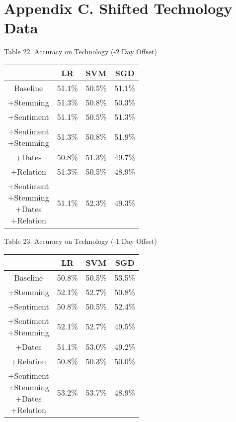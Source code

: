 \documentclass[11pt,a4paper]{article}
\begin{document}
\section{Appendix C. Shifted Technology Data}
\begin{center}
Table 22. Accuracy on Technology (-2 Day Offset)\\
\begin{tabular}{ |c|c|c|c| }
 \hline
  & LR & SVM & SGD \\
  \hline
  Baseline & 51.1\% & 50.5\% & 51.1\% \\
  \hline
 +Stemming & 51.3\% & 50.8\% & 50.3\% \\
  \hline
 +Sentiment & 51.1\% & 50.5\% & 51.3\% \\
  \hline
  \shortstack{+Sentiment \\ +Stemming} & 51.3\% & 50.8\% & 51.9\%\\
 \hline
 +Dates & 50.8\% & 51.3\% & 49.7\% \\
  \hline
 +Relation & 51.3\% & 50.5\% & 48.9\% \\
  \hline
  \shortstack{+Sentiment \\ +Stemming \\+Dates \\+Relation} & 51.1\% & 52.3\% & 49.3\% \\
 \hline
\end{tabular}
\end{center}

\begin{center}
Table 23. Accuracy on Technology (-1 Day Offset)\\
\begin{tabular}{ |c|c|c|c| }
 \hline
  & LR & SVM & SGD \\
  \hline
  Baseline & 50.8\% & 50.5\% & 53.5\% \\
  \hline
 +Stemming & 52.1\% & 52.7\% & 50.8\% \\
  \hline
 +Sentiment & 50.8\% & 50.5\% & 52.4\% \\
  \hline
  \shortstack{+Sentiment \\ +Stemming} & 52.1\% & 52.7\% & 49.5\%\\
 \hline
 +Dates & 51.1\% & 53.0\% & 49.2\% \\
  \hline
 +Relation & 50.8\% & 50.3\% & 50.0\% \\
  \hline
  \shortstack{+Sentiment \\ +Stemming \\+Dates \\+Relation} & 53.2\% & 53.7\% & 48.9\% \\
 \hline
\end{tabular}
\end{center}
\end{document}

